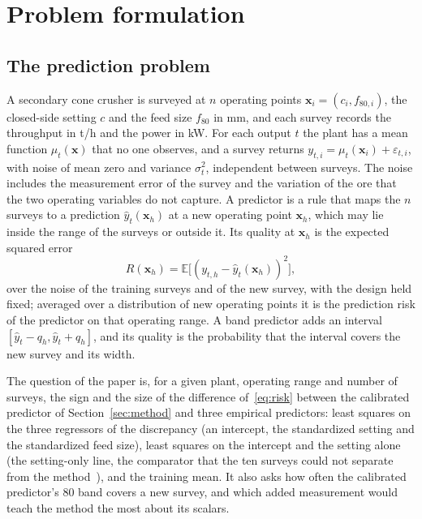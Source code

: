 \section{Problem formulation}\label{sec:problem}

\subsection{The prediction problem}

A secondary cone crusher is surveyed at $n$ operating points $\mathbf x_i=(c_i,f_{80,i})$, the closed-side setting $c$ and
the feed size $f_{80}$ in mm, and each survey records the throughput in t/h and the power in kW. For each output $t$ the plant
has a mean function $\mu_t(\mathbf x)$ that no one observes, and a survey returns $y_{t,i}=\mu_t(\mathbf x_i)+\varepsilon_{t,i}$,
with noise of mean zero and variance $\sigma_t^2$, independent between surveys. The noise includes the measurement error of
the survey and the variation of the ore that the two operating variables do not capture. A predictor is a rule that maps
the $n$ surveys to a prediction $\hat y_t(\mathbf x_h)$ at a new operating point $\mathbf x_h$, which may lie inside the
range of the surveys or outside it. Its quality at $\mathbf x_h$ is the expected squared error
\begin{equation}
R(\mathbf x_h)=\mathbb E\big[(y_{t,h}-\hat y_t(\mathbf x_h))^2\big],
\label{eq:risk}
\end{equation}
over the noise of the training surveys and of the new survey, with the design held fixed; averaged over a distribution of
new operating points it is the prediction risk of the predictor on that operating range. A band predictor adds an interval
$[\hat y_t-q_h,\hat y_t+q_h]$, and its quality is the probability that the interval covers the new survey and its width.

The question of the paper is, for a given plant, operating range and number of surveys, the sign and the size of the
difference of~\eqref{eq:risk} between the calibrated predictor of Section~\ref{sec:method} and three empirical predictors:
least squares on the three regressors of the discrepancy (an intercept, the standardized setting and the standardized feed
size), least squares on the intercept and the setting alone (the setting-only line, the comparator that the ten surveys could
not separate from the method~\cite{cb002}), and the training mean. It also asks how often the calibrated predictor's 80\pct{}
band covers a new survey, and which added measurement would teach the method the most about its scalars.

